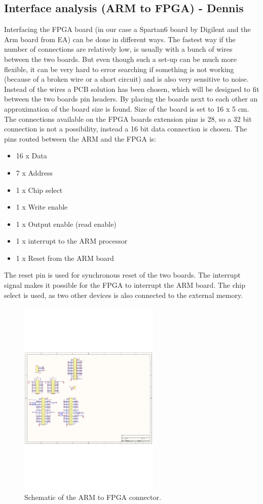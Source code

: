 \subsection{Interface analysis (ARM to FPGA) - Dennis}
Interfacing the FPGA board (in our case a Spartan6 board by Digilent and the Arm board from EA) can be done in different ways. The fastest way if the number of connections are relatively low, is usually with a bunch of wires between the two boards. But even though such a set-up can be much more flexible, it can be very hard to error searching if something is not working (because of a broken wire or a short circuit) and is also very sensitive to noise. Instead of the wires a PCB solution has been chosen, which will be designed to fit between the two boards pin headers. By placing the boards next to each other an approximation of the board size is found. Size of the board is set to 16 x 5 cm. The connections available on the FPGA boards extension pins is 28, so a 32 bit connection is not a possibility, instead a 16 bit data connection is chosen. The pins routed between the ARM and the FPGA is:
\begin{itemize}
	\item 16 x Data
	\item 7 x Address
	\item 1 x Chip select
	\item 1 x Write enable 
	\item 1 x Output enable (read enable)
	\item 1 x interrupt to the ARM processor
	\item 1 x Reset from the ARM board
\end{itemize}
The reset pin is used for synchronous reset of the two boards. The interrupt signal makes it possible for the FPGA to interrupt the ARM board. The chip select is used, as two other devices is also connected to the external memory.
\begin{figure}[H]
	\begin{centering}
		 \includegraphics[width=0.60\textwidth,page=1]{content/appendix/eudp/images/dig_to_ea_v0_1}
		\caption{Schematic of the ARM to FPGA connector.}
	\end{centering}
\end{figure}
